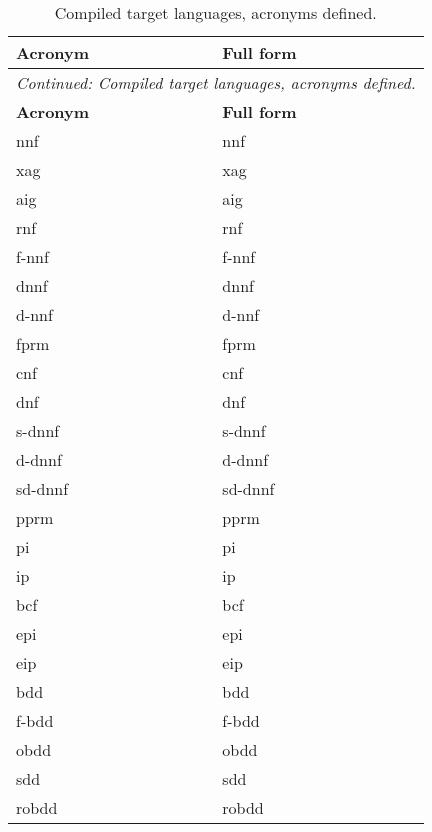 \begin{longtable}[ht!]{ll}
\caption{Compiled target languages, acronyms defined.} \\
\toprule
\textbf{Acronym} & \textbf{Full form} \\
\midrule
\endfirsthead

\multicolumn{2}{c}{\textit{Continued: Compiled target languages, acronyms defined.}} \\
\toprule
\textbf{Acronym} & \textbf{Full form} \\
\midrule
\endhead

\endfoot
\bottomrule
\endlastfoot

\acrshort{nnf}    & \acrlong{nnf}    \\
\acrshort{xag}    & \acrlong{xag}    \\
\acrshort{aig}    & \acrlong{aig}    \\
\acrshort{rnf}    & \acrlong{rnf}    \\
\acrshort{f-nnf}  & \acrlong{f-nnf}  \\
\acrshort{dnnf}   & \acrlong{dnnf}   \\
\acrshort{d-nnf}  & \acrlong{d-nnf}  \\
\acrshort{fprm}   & \acrlong{fprm}   \\
\acrshort{cnf}    & \acrlong{cnf}    \\
\acrshort{dnf}    & \acrlong{dnf}    \\
\acrshort{s-dnnf} & \acrlong{s-dnnf} \\
\acrshort{d-dnnf} & \acrlong{d-dnnf} \\
\acrshort{sd-dnnf} & \acrlong{sd-dnnf} \\
\acrshort{pprm}   & \acrlong{pprm}   \\
\acrshort{pi}     & \acrlong{pi}     \\
\acrshort{ip}     & \acrlong{ip}     \\
\acrshort{bcf}     & \acrlong{bcf}     \\
\acrshort{epi}    & \acrlong{epi}    \\
\acrshort{eip}    & \acrlong{eip}    \\
\acrshort{bdd}    & \acrlong{bdd}    \\
\acrshort{f-bdd}  & \acrlong{f-bdd}  \\
\acrshort{obdd}   & \acrlong{obdd}   \\
\acrshort{sdd}    & \acrlong{sdd}    \\
\acrshort{robdd}  & \acrlong{robdd}  \\
\end{longtable}